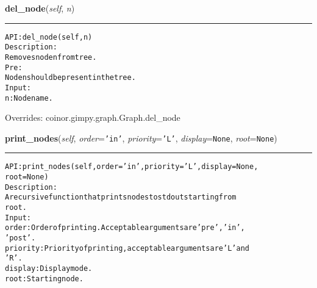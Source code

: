     \vspace{0.5ex}

\hspace{.8\funcindent}\begin{boxedminipage}{\funcwidth}

    \raggedright \textbf{del\_node}(\textit{self}, \textit{n})

    \vspace{-1.5ex}

    \rule{\textwidth}{0.5\fboxrule}
\setlength{\parskip}{2ex}
\begin{alltt}

API: del\_node(self, n)
Description:
    Removes node n from tree.
Pre:
    Node n should be present in the tree.
Input:
    n: Node name.
\end{alltt}

\setlength{\parskip}{1ex}
      Overrides: coinor.gimpy.graph.Graph.del\_node

    \end{boxedminipage}

    \label{coinor:gimpy:tree:BinaryTree:print_nodes}

    \vspace{0.5ex}

\hspace{.8\funcindent}\begin{boxedminipage}{\funcwidth}

    \raggedright \textbf{print\_nodes}(\textit{self}, \textit{order}={\tt \texttt{'}\texttt{in}\texttt{'}}, \textit{priority}={\tt \texttt{'}\texttt{L}\texttt{'}}, \textit{display}={\tt None}, \textit{root}={\tt None})

    \vspace{-1.5ex}

    \rule{\textwidth}{0.5\fboxrule}
\setlength{\parskip}{2ex}
\begin{alltt}

API: print\_nodes(self, order = 'in', priority = 'L', display = None,
            root = None)
Description:
    A recursive function that prints nodes to stdout starting from
    root.
Input:
    order: Order of printing. Acceptable arguments are 'pre', 'in',
    'post'.
    priority: Priority of printing, acceptable arguments are 'L' and
    'R'.
    display: Display mode.
    root: Starting node.
\end{alltt}

\setlength{\parskip}{1ex}
    \end{boxedminipage}

